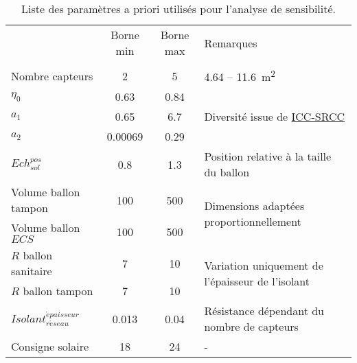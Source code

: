 \begin{table}
\centering
\caption{Liste des paramètres a priori utilisés pour l’analyse de sensibilité.}
\label{tab:facteur_sensibilite}
\begin{tabular}{l c c l}
  \toprule
  \addlinespace
                                               & Borne min     & Borne max   & Remarques                                                            \\
  \addlinespace
  \multicolumn{4}{l}{\bm{$SSC$}}                                                                           \\
  \midrule
  Nombre capteurs                              & \num{2}       & \num{5}     & \num{4.64} -- \SI{11.6}{\metre\squared}                              \\
  $\eta_{0}$                                   & \num{0.63}    & \num{0.84}  & \multirow{3}{*}{Diversité issue de \href{www.solar-rating.org}{ICC-SRCC}}   \\
  $a_{1}$                                      & \num{0.65}    & \num{6.7}   &                                                                      \\
  $a_{2}$                                      & \num{0.00069} & \num{0.29}  &                                                                      \\
  $Ech_{sol}^{pos}$                            & \num{0.8}     & \num{1.3}   & Position relative à la taille du ballon                              \\
  Volume ballon tampon                         & \num{100}     & \num{500}   & \multirow{2}{*}{Dimensions adaptées proportionnellement}             \\
  Volume ballon $ECS$                          & \num{100}     & \num{500}   &                                                                      \\
  $R$ ballon sanitaire                         & \num{7}       & \num{10}    & \multirow{2}{*}{Variation uniquement de l’épaisseur de l’isolant}    \\
  $R$ ballon tampon                            & \num{7}       & \num{10}    &                                                                      \\
  $Isolant_{r\acute eseau}^{\acute epaisseur}$ & \num{0.013}   & \num{0.04}  & Résistance dépendant du nombre de capteurs                           \\
  Consigne solaire                             & \num{18}      & \num{24}    &  -                                                                   \\

\end{tabular}
\end{table}

